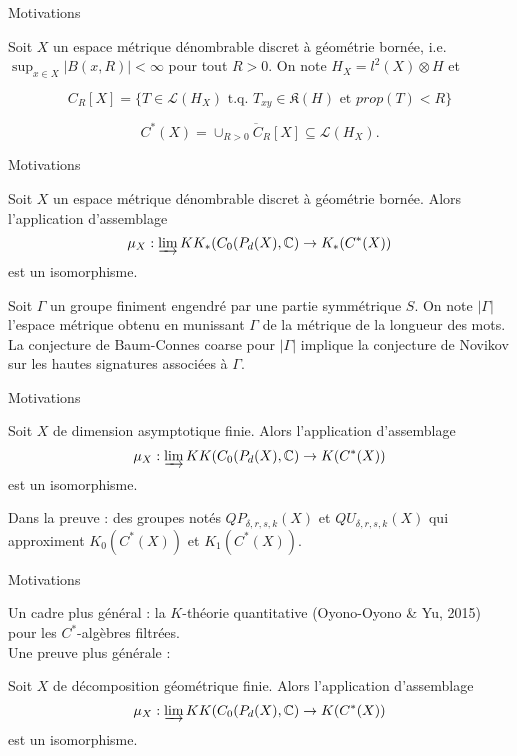 \begin{frame}{Motivations}

Soit $X$ un espace métrique dénombrable discret à géométrie bornée, i.e. $\sup_{x\in X} |B(x,R)|<\infty$ pour tout $R>0$. On note $H_X = l^2(X)\otimes H$ et 

\[C_R[X] = \{T\in \mathcal L(H_X) \text{ t.q. } T_{xy} \in \mathfrak K(H) \text{ et } prop(T) < R \}\]

\begin{definitionfr}
\[C^*(X) = \overline{\cup_{R>0} C_R[X]} \subseteq \mathcal L(H_X).\]
\end{definitionfr}
\end{frame}

\begin{frame}{Motivations}
\begin{conj}
Soit $X$ un espace métrique dénombrable discret à géométrie bornée. Alors l'application d'assemblage
\[\mu_X : \varinjlim KK_*(C_0(P_d(X),\mathbb C) \rightarrow K_*(C^*(X))\]
est un isomorphisme.
\end{conj}

Soit $\Gamma$ un groupe finiment engendré par une partie symmétrique $S$. On note $|\Gamma|$ l'espace métrique obtenu en munissant $\Gamma$ de la métrique de la longueur des mots. \\

La conjecture de Baum-Connes coarse pour $|\Gamma |$ implique la conjecture de Novikov sur les hautes signatures associées à $\Gamma$. 
\end{frame}

\begin{frame}{Motivations}

\begin{thmfr}[Yu, 2010]
Soit $X$ de dimension asymptotique finie. Alors l'application d'assemblage
\[\mu_X : \varinjlim KK(C_0(P_d(X),\mathbb C) \rightarrow K(C^*(X))\]
est un isomorphisme.
\end{thmfr}

Dans la preuve : des groupes notés $QP_{\delta, r ,s, k}(X)$ et $QU_{\delta, r ,s, k}(X)$ qui approximent $K_0(C^*(X))$ et $K_1(C^*(X))$.

\end{frame}

\begin{frame}{Motivations}

Un cadre plus général : la $K$-théorie quantitative (Oyono-Oyono \& Yu, 2015) pour les $C^*$-algèbres filtrées.\\

Une preuve plus générale :

\begin{thmfr}
Soit $X$ de décomposition géométrique finie. Alors l'application d'assemblage
\[\mu_X : \varinjlim KK(C_0(P_d(X),\mathbb C) \rightarrow K(C^*(X))\]
est un isomorphisme.
\end{thmfr}

\end{frame}

